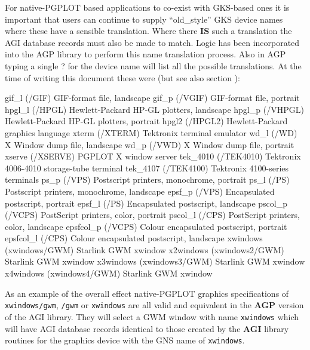 \documentclass[twoside,11pt]{starlink}
\begin{document}
For native-PGPLOT based applications to co-exist with GKS-based ones
it is important that users can continue to supply ``old\_style'' GKS device
names where these have a sensible translation. Where there \textbf{IS} such
a translation the AGI  database records must also be made to match.
Logic has been incorporated into the AGP library to perform this name
translation process.
Also in AGP typing a single ? for the device name will list all the possible
translations. At the time of writing this document these were (but see also
section ):
\begin{terminalv}
gif_l     (/GIF)           GIF-format file, landscape
gif_p     (/VGIF)          GIF-format file, portrait
hpgl_l    (/HPGL)          Hewlett-Packard HP-GL plotters, landscape
hpgl_p    (/VHPGL)         Hewlett-Packard HP-GL plotters, portrait
hpgl2     (/HPGL2)         Hewlett-Packard graphics language
xterm     (/XTERM)         Tektronix terminal emulator
wd_l      (/WD)            X Window dump file, landscape
wd_p      (/VWD)           X Window dump file, portrait
xserve    (/XSERVE)        PGPLOT X window server
tek_4010  (/TEK4010)       Tektronix 4006-4010 storage-tube terminal
tek_4107  (/TEK4100)       Tektronix 4100-series terminals
ps_p      (/VPS)           Postscript printers, monochrome, portrait
ps_l      (/PS)            Postscript printers, monochrome, landscape
epsf_p    (/VPS)           Encapsulated postscript, portrait
epsf_l    (/PS)            Encapsulated postscript, landscape
pscol_p   (/VCPS)          PostScript printers, color, portrait
pscol_l   (/CPS)           PostScript printers, color, landscape
epsfcol_p (/VCPS)          Colour encapsulated postscript, portrait
epsfcol_l (/CPS)           Colour encapsulated postscript, landscape
xwindows  (xwindows/GWM)   Starlink GWM xwindow
x2windows (xwindows2/GWM)  Starlink GWM xwindow
x3windows (xwindows3/GWM)  Starlink GWM xwindow
x4windows (xwindows4/GWM)  Starlink GWM xwindow
\end{terminalv}

As an example of the overall effect native-PGPLOT graphics
specifications of \texttt{xwindows/gwm}, \texttt{\//gwm} or \texttt{xwindows}
are all valid and equivalent in the \textbf{AGP} version of the AGI
library. They will select a GWM window with name \texttt{xwindows} which
will have AGI database records identical to those created by the
\textbf{AGI} library routines for the graphics device with the GNS name of
\texttt{xwindows}.
\end{document}
